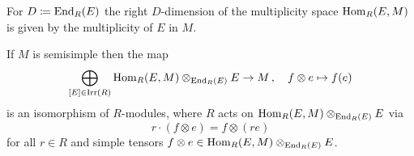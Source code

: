 \begin{corollary}
  \label{corollary: dimension of multiplicity space is multiplicity}
  For $D \coloneqq \operatorname{End}_R(E)$ the right $D$-dimension of the multiplicity space $\operatorname{Hom}_R(E,M)$ is given by the multiplicity of $E$ in $M$.
\end{corollary}


\begin{corollary}
  If $M$ is semisimple then the map
  \[
            \bigoplus_{[E] \in \operatorname{Irr}(R)} \operatorname{Hom}_R(E, M) \otimes_{\operatorname{End}_R(E)} E
    \to     M \,,
    \quad   f \otimes e
    \mapsto f(e)
  \]
  is an isomorphism of $R$-modules, where $R$ acts on $\operatorname{Hom}_R(E, M) \otimes_{\operatorname{End}_R(E)} E$ via
  \[
      r \cdot (f \otimes e)
    = f \otimes (re)
  \]
  for all $r \in R$ and simple tensors $f \otimes e \in \operatorname{Hom}_R(E, M) \otimes_{\operatorname{End}_R(E)} E$.
\end{corollary}




